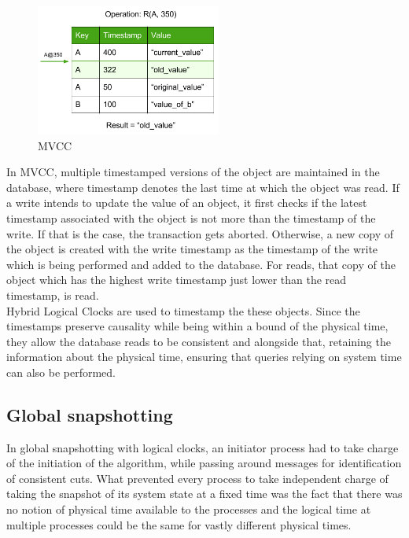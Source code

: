 \documentclass{article}
\begin{document}
    \begin{figure}[h!]
        \begin{center}
        \includegraphics[resolution=125]{mvcc.png}
        \end{center}
        \caption{MVCC}
    \end{figure}

    In MVCC, multiple timestamped versions of the object are maintained in the database, where timestamp denotes the last time at which the object was read. If a write intends to update the value of an object, it first checks if the latest timestamp associated with the object is not more than the timestamp of the write. If that is the case, the transaction gets aborted. Otherwise, a new copy of the object is created with the write timestamp as the timestamp of the write which is being performed and added to the database. For reads, that copy of the object which has the highest write timestamp just lower than the read timestamp, is read. \\

    Hybrid Logical Clocks are used to timestamp the these objects. Since the timestamps preserve causality while being within a bound of the physical time, they allow the database reads to be consistent and alongside that, retaining the information about the physical time, ensuring that queries relying on system time can also be performed.

    \subsection{Global snapshotting}

    In global snapshotting with logical clocks, an initiator process had to take charge of the initiation of the algorithm, while passing around messages for identification of consistent cuts. What prevented every process to take independent charge of taking the snapshot of its system state at a fixed time was the fact that there was no notion of physical time available to the processes and the logical time at multiple processes could be the same for vastly different physical times. \\
\end{document}
